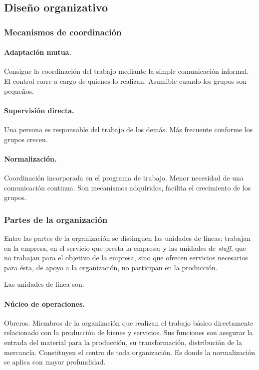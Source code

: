 \documentclass[12pt]{article}
\theoremstyle{definition_wo_parentheses}
\begin{document}
\subsection{Diseño organizativo}

\subsubsection{Mecanismos de coordinación}

\paragraph{Adaptación mutua.} Consigue la coordinación del trabajo mediante la simple comunicación informal. El control corre a cargo de quienes lo realizan. Asumible cuando los grupos son pequeños.

\paragraph{Supervisión directa.} Una persona es responsable del trabajo de los demás. Más frecuente conforme los grupos crecen.

\paragraph{Normalización.} Coordinación incorporada en el programa de trabajo. Menor necesidad de una comunicación continua. Son mecanismos adquiridos, facilita el crecimiento de los grupos. 

\subsubsection{Partes de la organización}

Entre las partes de la organización se distinguen las unidades de líneas; trabajan en la empresa, en el servicio que presta la empresa; y las unidades de \textit{staff}, que no trabajan para el objetivo de la empresa, sino que ofrecen servicios necesarios para ésta, de apoyo a la organización, no participan en la producción.

Las unidades de línea son:
\paragraph{Núcleo de operaciones.} Obreros. Miembros de la organización que realizan el trabajo básico directamente relacionado con la producción de bienes y servicios. Sus funciones son asegurar la entrada del material para la producción, su transformación, distribución de la mercancía. Constituyen el centro de toda organización. Es donde la normalización se aplica con mayor profundidad.
\end{document}
